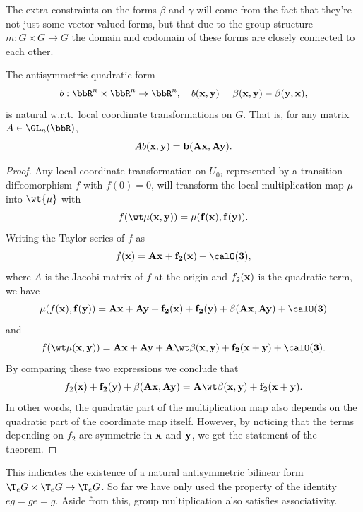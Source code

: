The extra constraints on the forms $\beta$ and $\gamma$ will come from the fact that they're not just some vector-valued forms, but that due to the group structure $m:G\times G\to G$ the domain and codomain of these forms are closely connected to each other. 



\begin{lem}
    The antisymmetric quadratic form
    \[b:\bbR^n\times\bbR^n\to \bbR^n,\quad b(\bf{x},\bf{y})=\beta(\bf{x},\bf{y})-\beta(\bf{y},\bf{x}),\]
    is natural w.r.t.\ local coordinate transformations on $G$. That is, for any matrix $A\in\GL_n(\bbR)$,
    \[A b(\bf{x},\bf{y})=b(A\bf{x},A\bf{y}).\]
\end{lem}
\begin{proof}
    Any local coordinate transformation on $U_0$, represented by a transition diffeomorphism $f$ with $f(0)=0$, will transform the local multiplication map $\mu$ into $\wt{\mu}$ with
    \[f(\wt\mu(\bf{x},\bf{y}))=\mu(f(\bf{x}),f(\bf{y})).\]
    Writing the Taylor series of $f$ as
    \[f(\bf{x})=A\bf{x}+f_2(\bf{x})+\calO(3),\]
    where $A$ is the Jacobi matrix of $f$ at the origin and $f_2(\bf{x})$ is the quadratic term, we have
    \[\mu(f(\bf{x}),f(\bf{y}))=A\bf{x}+A\bf{y}+f_2(\bf{x})+f_2(\bf{y})+\beta(A\bf{x},A\bf{y})+\calO(3)\]
    and
    \[f(\wt\mu(\bf{x},\bf{y}))=A\bf{x}+A\bf{y}+A\wt\beta(\bf{x},\bf{y})+f_2(\bf{x}+\bf{y})+\calO(3).\]
    By comparing these two expressions we conclude that
    \[f_2(\bf{x})+f_2(\bf{y})+\beta(A\bf{x},A\bf{y})=A\wt\beta(\bf{x},\bf{y})+f_2(\bf{x}+\bf{y}).\]
    In other words, the quadratic part of the multiplication map also depends on the quadratic part of the coordinate map itself. However, by noticing that the terms depending on $f_2$ are symmetric in $\bf{x}$ and $\bf{y}$, we get the statement of the theorem.
\end{proof}

This indicates the existence of a natural antisymmetric bilinear form $\T_e G\times \T_eG\to \T_e G$. So far we have only used the property of the identity $eg=ge=g$. Aside from this, group multiplication also satisfies associativity.

